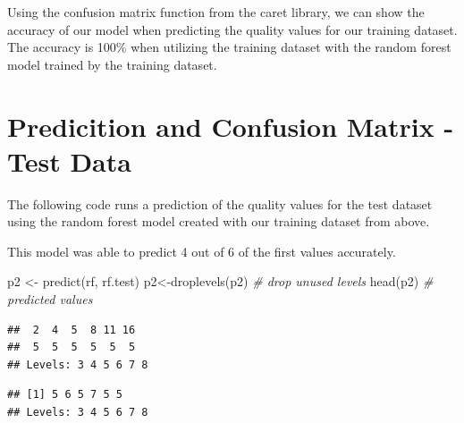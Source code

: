 \documentclass[
]{book}
\newenvironment{Shaded}{\begin{snugshade}}{\end{snugshade}}
\newcommand{\CommentTok}[1]{\textcolor[rgb]{0.56,0.35,0.01}{\textit{#1}}}
\newcommand{\FunctionTok}[1]{\textcolor[rgb]{0.00,0.00,0.00}{#1}}
\newcommand{\NormalTok}[1]{#1}
\newcommand{\OtherTok}[1]{\textcolor[rgb]{0.56,0.35,0.01}{#1}}
\newcommand{\SpecialCharTok}[1]{\textcolor[rgb]{0.00,0.00,0.00}{#1}}
\begin{document}
Using the confusion matrix function from the caret library, we can show the accuracy of our model when predicting the quality values for our training dataset. The accuracy is 100\% when utilizing the training dataset with the random forest model trained by the training dataset.

\hypertarget{predicition-and-confusion-matrix---test-data}{%
\section{Predicition and Confusion Matrix - Test Data}\label{predicition-and-confusion-matrix---test-data}}

The following code runs a prediction of the quality values for the test dataset using the random forest model created with our training dataset from above.

This model was able to predict 4 out of 6 of the first values accurately.

\begin{Shaded}
\begin{Highlighting}[]
\NormalTok{p2 }\OtherTok{\textless{}{-}} \FunctionTok{predict}\NormalTok{(rf, rf.test)}
\NormalTok{p2}\OtherTok{\textless{}{-}}\FunctionTok{droplevels}\NormalTok{(p2) }\CommentTok{\# drop unused levels}
\FunctionTok{head}\NormalTok{(p2) }\CommentTok{\# predicted values}
\end{Highlighting}
\end{Shaded}

\begin{verbatim}
##  2  4  5  8 11 16 
##  5  5  5  5  5  5 
## Levels: 3 4 5 6 7 8
\end{verbatim}

\begin{Shaded}
\end{Shaded}

\begin{verbatim}
## [1] 5 6 5 7 5 5
## Levels: 3 4 5 6 7 8
\end{verbatim}

\begin{Shaded}
\end{Shaded}
\end{document}
